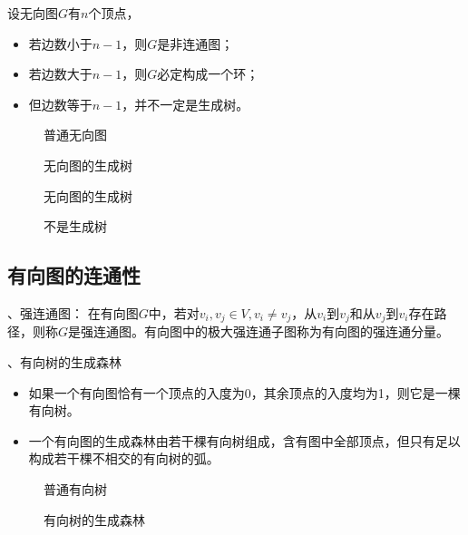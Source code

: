 \documentclass[10pt]{article}
\begin{document}
设无向图$G$有$n$个顶点， 
\begin{itemize}
\item
若边数小于$n-1$，则$G$是非连通图； 
\item
若边数大于$n-1$，则$G$必定构成一个环； 
\item
但边数等于$n-1$，并不一定是生成树。
\end{itemize}
 
\begin{figure}
\centering

\caption{普通无向图}
\end{figure}
 
\begin{figure}
\centering

\caption{无向图的生成树}
\end{figure}
 
\begin{figure}
\centering

\caption{无向图的生成树}
\end{figure}
 
\begin{figure}
\centering

\caption{不是生成树}
\end{figure}

\subsection{有向图的连通性}

、强连通图：
在有向图$G$中，若对$v_i,v_j\in V, v_i\ne v_j$，从$v_i$到$v_j$和从$v_j$到$v_i$存在路径，则称$G$是强连通图。有向图中的极大强连通子图称为有向图的强连通分量。
  
\begin{figure}
\centering

\end{figure}
 
 
、有向树的生成森林
\begin{itemize}
\item 如果一个有向图恰有一个顶点的入度为0，其余顶点的入度均为1，则它是一棵有向树。 
\item
一个有向图的生成森林由若干棵有向树组成，含有图中全部顶点，但只有足以构成若干棵不相交的有向树的弧。
\end{itemize}
 
\begin{figure}
\centering

\caption{普通有向树}
\end{figure}
 
\begin{figure}
\centering

\caption{有向树的生成森林}
\end{figure}
 
\end{document}
